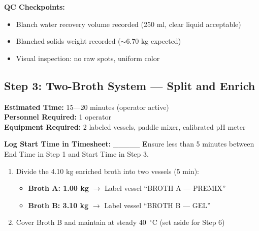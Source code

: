 {\textbf{QC Checkpoints:}
\begin{itemize}
\item Blanch water recovery volume recorded (250 ml, clear liquid acceptable)
\item Blanched solids weight recorded ($\sim$6.70 kg expected)
\item Visual inspection: no raw spots, uniform color
\end{itemize}


\subsection*{Step 3: Two-Broth System --- Split and Enrich}
\textbf{Estimated Time:} 15---20 minutes (operator active) \\
\textbf{Personnel Required:} 1 operator \\
\textbf{Equipment Required:} 2 labeled vessels, paddle mixer, calibrated pH meter

\textbf{Log Start Time in Timesheet:} \_\_\_\_\_
\textbf Ensure less than 5 minutes between End Time in Step 1 and Start Time in Step 3. 
\begin{enumerate}[leftmargin=1.5em]
\item Divide the 4.10 kg enriched broth into two vessels (5 min):
  \begin{itemize}
  \item \textbf{Broth A: 1.00 kg} 
$\rightarrow$ Label vessel ``BROTH A --- PREMIX''
  \item \textbf{Broth B: 3.10 kg} $\rightarrow$ Label vessel ``BROTH B --- GEL''
  \end{itemize}
\item Cover Broth B and maintain at steady 40~$^\circ$C (set aside for Step 6)
\end{enumerate}

}
